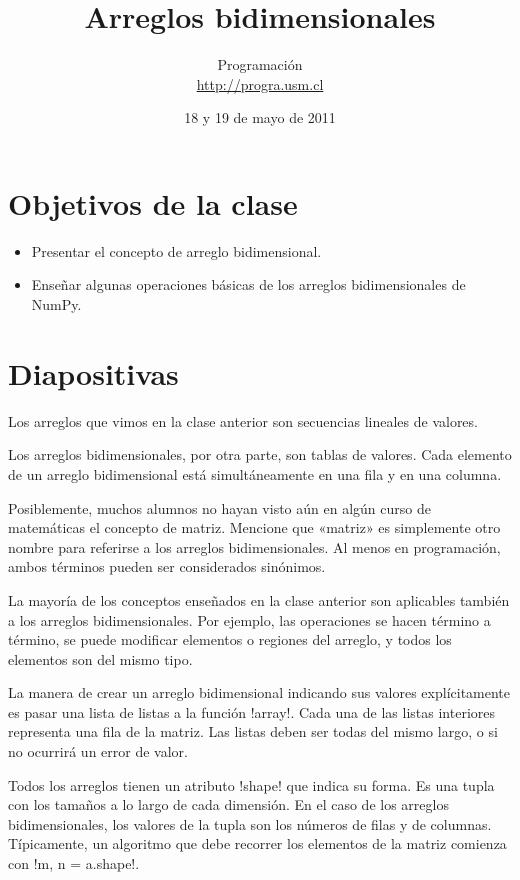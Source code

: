 \documentclass[10pt]{article}
\title{Arreglos bidimensionales}
\author{Programación \\ \url{http://progra.usm.cl}}
\date{18 y 19 de mayo de 2011}
\begin{document}
  \maketitle

  \section*{Objetivos de la clase}
  \begin{itemize}
    \item Presentar el concepto
      de arreglo bidimensional.
    \item Enseñar algunas operaciones básicas
      de los arreglos bidimensionales de NumPy.
  \end{itemize}

  \section*{Diapositivas}

  Los arreglos que vimos en la clase anterior
  son secuencias lineales de valores.

  Los arreglos bidimensionales, por otra parte,
  son tablas de valores.
  Cada elemento de un arreglo bidimensional
  está simultáneamente en una fila y en una columna.

  Posiblemente,
  muchos alumnos no hayan visto aún en algún curso de matemáticas
  el concepto de matriz.
  Mencione que «matriz» es simplemente otro nombre
  para referirse a los arreglos bidimensionales.
  Al menos en programación,
  ambos términos pueden ser considerados sinónimos.

  La mayoría de los conceptos enseñados en la clase anterior
  son aplicables también a los arreglos bidimensionales.
  Por ejemplo, las operaciones se hacen término a término,
  se puede modificar elementos o regiones del arreglo, y
  todos los elementos son del mismo tipo.


  La manera de crear un arreglo bidimensional
  indicando sus valores explícitamente
  es pasar una lista de listas
  a la función \li!array!.
  Cada una de las listas interiores
  representa una fila de la matriz.
  Las listas deben ser todas del mismo largo,
  o si no ocurrirá un error de valor.

  Todos los arreglos tienen un atributo \li!shape!
  que indica su forma.
  Es una tupla con los tamaños a lo largo de cada dimensión.
  En el caso de los arreglos bidimensionales,
  los valores de la tupla son los números de filas y de columnas.
  Típicamente,
  un algoritmo que debe recorrer los elementos de la matriz
  comienza con \li!m, n = a.shape!.
\end{document}
